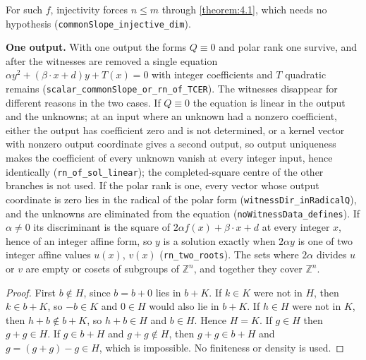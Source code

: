 For such $f$, injectivity forces $n ≤ m$ through \cref{theorem:4.1}, which needs no hypothesis (\texttt{commonSlope\_injective\_dim}).

\textbf{One output.} With one output the forms $Q ≡ 0$ and polar rank one survive, and after the witnesses are removed a single equation $αy^{2} + (β · x + d)y + T(x) = 0$ with integer coefficients and $T$ quadratic remains (\texttt{scalar\_commonSlope\_or\_rn\_of\_TCER}). The witnesses disappear for different reasons in the two cases. If $Q ≡ 0$ the equation is linear in the output and the unknowns; at an input where an unknown had a nonzero coefficient, either the output has coefficient zero and is not determined, or a kernel vector with nonzero output coordinate gives a second output, so output uniqueness makes the coefficient of every unknown vanish at every integer input, hence identically (\texttt{rn\_of\_sol\_linear}); the completed-square centre of the other branches is not used. If the polar rank is one, every vector whose output coordinate is zero lies in the radical of the polar form (\texttt{witnessDir\_inRadicalQ}), and the unknowns are eliminated from the equation (\texttt{noWitnessData\_defines}). If $α ≠ 0$ its discriminant is the square of $2αf(x) + β · x + d$ at every integer $x$, hence of an integer affine form, so $y$ is a solution exactly when $2αy$ is one of two integer affine values $u(x)$, $v(x)$ (\texttt{rn\_two\_roots}). The sets where $2α$ divides $u$ or $v$ are empty or cosets of subgroups of $ℤ^{n}$, and together they cover $ℤ^{n}$.


\begin{proof}
First $b ∉ H$, since $b = b + 0$ lies in $b + K$. If $k ∈ K$ were not in $H$, then $k ∈ b + K$, so $-b ∈ K$ and $0 ∈ H$ would also lie in $b + K$. If $h ∈ H$ were not in $K$, then $h + b ∉ b + K$, so $h + b ∈ H$ and $b ∈ H$. Hence $H = K$. If $g ∈ H$ then $g + g ∈ H$. If $g ∈ b + H$ and $g + g ∉ H$, then $g + g ∈ b + H$ and $g = (g + g) - g ∈ H$, which is impossible. No finiteness or density is used.
\end{proof}


